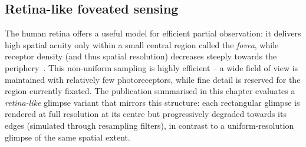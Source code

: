 \subsection{Retina-like foveated sensing}
\label{sec:prelim-retina}

The human retina offers a useful model for efficient partial observation: it delivers high spatial acuity only within a small central region called the \emph{fovea}, while receptor density (and thus spatial resolution) decreases steeply towards the periphery~\cite{curcio1990human,sandini2003retina}. This non-uniform sampling is highly efficient -- a wide field of view is maintained with relatively few photoreceptors, while fine detail is reserved for the region currently fixated. The publication summarised in this chapter evaluates a \emph{retina-like} glimpse variant that mirrors this structure: each rectangular glimpse is rendered at full resolution at its centre but progressively degraded towards its edges (simulated through resampling filters), in contrast to a uniform-resolution glimpse of the same spatial extent.
